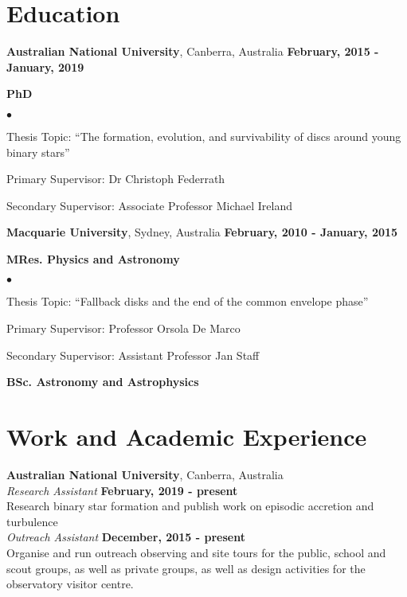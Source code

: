 \documentclass[margin,line]{res}
\newenvironment{list1}{
	\begin{list}{\ding{113}}{%
			\setlength{\itemsep}{0in}
			\setlength{\parsep}{0in} \setlength{\parskip}{0in}
			\setlength{\topsep}{0in} \setlength{\partopsep}{0in} 
			\setlength{\leftmargin}{0.17in}}}{\end{list}}
\newenvironment{list2}{
	\begin{list}{$\bullet$}{%
			\setlength{\itemsep}{0in}
			\setlength{\parsep}{0in} \setlength{\parskip}{0in}
			\setlength{\topsep}{0in} \setlength{\partopsep}{0in} 
			\setlength{\leftmargin}{0.2in}}}{\end{list}}
\begin{document}
\begin{resume}
		\section{\sc Education}
		{\bf Australian National University}, Canberra, Australia \hfill {\bf February, 2015 - January, 2019}\\
		\vspace*{-.1in}
		\begin{list1}
			\item[] {\bf PhD}
			\begin{list2}
				\vspace*{.05in}
				\item Thesis Topic:  ``The formation, evolution, and survivability of discs around young binary stars'' 
				\item Primary Supervisor: Dr Christoph Federrath
				\item Secondary Supervisor: Associate Professor Michael Ireland
			\end{list2}
		\end{list1}
		{\bf Macquarie University}, Sydney, Australia \hfill {\bf February, 2010 - January, 2015}\\ 
		\vspace*{-.1in}
		\begin{list1}
			\item[] {\bf MRes. Physics and Astronomy}
			\begin{list2}
				\vspace*{.05in}
				\item Thesis Topic:  ``Fallback disks and the end of the common envelope phase'' 
				\item Primary Supervisor:  Professor Orsola De Marco
				\item Secondary Supervisor: Assistant Professor Jan Staff
			\end{list2}
			\vspace*{.05in}
			\item[] {\bf BSc. Astronomy and Astrophysics}
		\end{list1}
		
		\section{\sc Work and Academic Experience}
		{\bf Australian National University}, Canberra, Australia\\
		{\em Research Assistant} \hfill {\bf February, 2019 - present}\\
		Research binary star formation and publish work on episodic accretion and turbulence\\
		{\em Outreach Assistant} \hfill {\bf December, 2015 - present}\\
		Organise and run outreach observing and site tours for the public, school and scout groups, as well as private groups, as well as design activities for the observatory visitor centre.
		

\end{resume}
\end{document}
